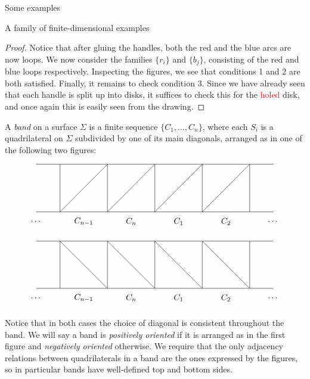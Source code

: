 \begin{chapter}{Some examples}
\begin{section}{A family of finite-dimensional examples}
\begin{proof}
Notice that after gluing the handles, both the red and the blue arcs are now loops. We now consider the families $\{r_i\}$ and $\{b_j\}$, consisting of the red and blue loops respectively. Inspecting the figures, we see that conditions 1 and 2 are both satisfied. Finally, it remains to check condition 3. Since we have already seen that each handle is split up into disks, it suffices to check this for the \textcolor{red}{holed} disk, and once again this is easily seen from the drawing.
\end{proof}

A \emph{band} on a surface $\Sigma$ is a finite sequence $\{C_1, \dots, C_n\}$, where each $S_i$ is a quadrilateral on $\Sigma$ subdivided by one of its main diagonals, arranged as in one of the following two figures:

\[
\begin{tikzpicture}
\draw (-5,1) -- (5,1);
\draw (-5,-1) -- (5,-1);

\foreach \x in {-4,-2,...,4}
\draw (\x,1) -- (\x,-1);

\foreach \x in {-4,-2,...,2}
\draw (\x,-1) -- (\x+2, 1);

\node at (-5,-1.4) {$\dots$};
\node at (-3,-1.4) {$C_{n-1}$};
\node at (-1,-1.4) {$C_{n}$};
\node at (1,-1.4) {$C_{1}$};
\node at (3,-1.4) {$C_{2}$};
\node at (5,-1.4) {$\dots$};
\end{tikzpicture}
\]

\[
\begin{tikzpicture}
\draw (-5,1) -- (5,1);
\draw (-5,-1) -- (5,-1);

\foreach \x in {-4,-2,...,4}
\draw (\x,1) -- (\x,-1);

\foreach \x in {-4,-2,...,2}
\draw (\x,1) -- (\x+2, -1);

\node at (-5,-1.4) {$\dots$};
\node at (-3,-1.4) {$C_{n-1}$};
\node at (-1,-1.4) {$C_{n}$};
\node at (1,-1.4) {$C_{1}$};
\node at (3,-1.4) {$C_{2}$};
\node at (5,-1.4) {$\dots$};
\end{tikzpicture}
\]

Notice that in both cases the choice of diagonal is consistent throughout the band. We will say a band is \emph{positively oriented} if it is arranged as in the first figure and \emph{negatively oriented} otherwise. We require that the only adjacency relations between quadrilaterals in a band are the ones expressed by the figures, so in particular bands have well-defined top and bottom sides.
\end{section}
\end{chapter}